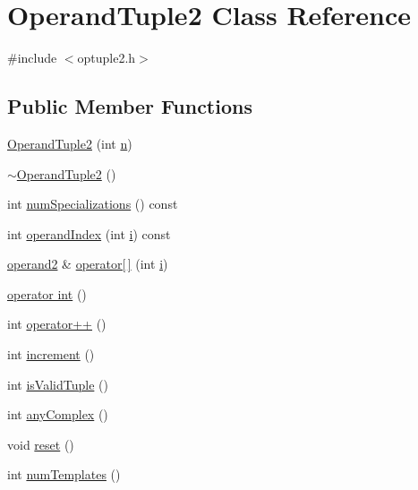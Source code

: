 \hypertarget{classOperandTuple2}{}\section{Operand\+Tuple2 Class Reference}
\label{classOperandTuple2}


{\ttfamily \#include $<$optuple2.\+h$>$}

\subsection*{Public Member Functions}
\begin{DoxyCompactItemize}
\item 
\hyperlink{classOperandTuple2_ac96a48f508969bebaeaf67df941577c9}{Operand\+Tuple2} (int \hyperlink{indexexpr_8h_ab427e2e2b4d6cec55fa088ea2a692ace}{n})
\item 
\hyperlink{classOperandTuple2_aa91c44c2bc50405b7a5787eccae171f4}{$\sim$\+Operand\+Tuple2} ()
\item 
int \hyperlink{classOperandTuple2_a1ed4b8d7d5540cf26b1db81c55b92593}{num\+Specializations} () const 
\item 
int \hyperlink{classOperandTuple2_a5bbb917cd5e8b5cd93f714e5dd8a353d}{operand\+Index} (int \hyperlink{indexexpr_8h_aabd77643995707c185e95c8cb2782c81}{i}) const 
\item 
\hyperlink{classoperand2}{operand2} \& \hyperlink{classOperandTuple2_a0a58aae007bf91afdd194e358b7bd191}{operator\mbox{[}$\,$\mbox{]}} (int \hyperlink{indexexpr_8h_aabd77643995707c185e95c8cb2782c81}{i})
\item 
\hyperlink{classOperandTuple2_add19d2049ecec6ac89b21ef9e55af58e}{operator int} ()
\item 
int \hyperlink{classOperandTuple2_a586b4e6efce72655a30c24d6321419c0}{operator++} ()
\item 
int \hyperlink{classOperandTuple2_aa47ad3d9e8af157660e5675d1aa32ea9}{increment} ()
\item 
int \hyperlink{classOperandTuple2_adab69e173820eb613ad181090ec73e0a}{is\+Valid\+Tuple} ()
\item 
int \hyperlink{classOperandTuple2_a0b7fba5c0dfc62a1fb4c234169efcb81}{any\+Complex} ()
\item 
void \hyperlink{classOperandTuple2_aae021a518cae2cb7ba845d9caf72e37b}{reset} ()
\item 
int \hyperlink{classOperandTuple2_aaa889ee757c4e04efa7730c4161af58f}{num\+Templates} ()
\item 

\end{DoxyCompactItemize}
